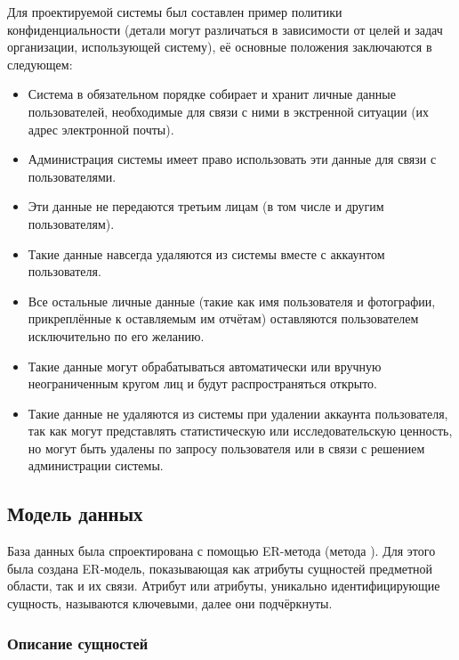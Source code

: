 \tab
Для проектируемой системы был составлен пример политики конфиденциальности (детали могут различаться в зависимости от целей и задач организации, использующей систему), её основные положения заключаются в следующем:
\begin{itemize}
	\item Система в обязательном порядке собирает и хранит личные данные пользователей, необходимые для связи с ними в экстренной ситуации (их адрес электронной почты).
	\item Администрация системы имеет право использовать эти данные для связи с пользователями.
	\item Эти данные не передаются третьим лицам (в том числе и другим пользователям).
	\item Такие данные навсегда удаляются из системы вместе с аккаунтом пользователя.
	\item Все остальные личные данные (такие как имя пользователя и фотографии, прикреплённые к оставляемым им отчётам) оставляются пользователем исключительно по его желанию.
	\item Такие данные могут обрабатываться автоматически или вручную неограниченным кругом лиц и будут распространяться открыто.
	\item Такие данные не удаляются из системы при удалении аккаунта пользователя, так как могут представлять статистическую или исследовательскую ценность, но могут быть удалены по запросу пользователя или в связи с решением администрации системы.
\end{itemize}

\subsection{Модель данных}

\tab
База данных была спроектирована с помощью ER-метода (метода ).
Для этого была создана ER‐модель, показывающая как атрибуты сущностей предметной области, так и их связи.
Атрибут или атрибуты, уникально идентифицирующие сущность, называются ключевыми, далее они подчёркнуты.

\subsubsection{Описание сущностей}

